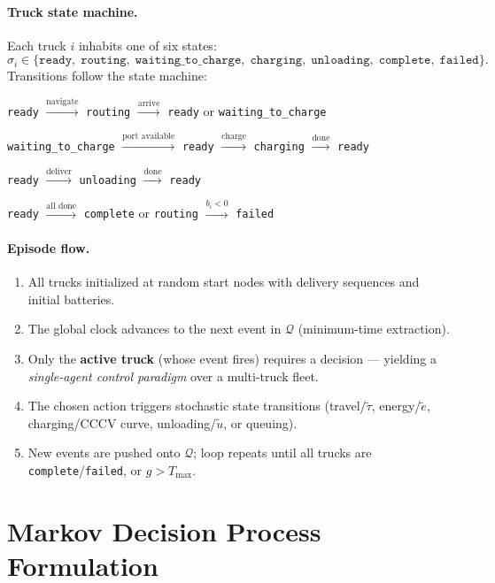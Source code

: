 \documentclass[11pt]{article}
\begin{document}
\paragraph{Truck state machine.}
Each truck $i$ inhabits one of six states:
\[
\sigma_i \in \{\texttt{ready},\; \texttt{routing},\; \texttt{waiting\_to\_charge},\; \texttt{charging},\; \texttt{unloading},\; \texttt{complete},\; \texttt{failed}\}.
\]
Transitions follow the state machine:
\begin{center}
\texttt{ready} $\xrightarrow{\text{navigate}}$ \texttt{routing} $\xrightarrow{\text{arrive}}$ \texttt{ready} or \texttt{waiting\_to\_charge}

\texttt{waiting\_to\_charge} $\xrightarrow{\text{port available}}$ \texttt{ready} $\xrightarrow{\text{charge}}$ \texttt{charging} $\xrightarrow{\text{done}}$ \texttt{ready}

\texttt{ready} $\xrightarrow{\text{deliver}}$ \texttt{unloading} $\xrightarrow{\text{done}}$ \texttt{ready}

\texttt{ready} $\xrightarrow{\text{all done}}$ \texttt{complete} \quad or \quad \texttt{routing} $\xrightarrow{b_i < 0}$ \texttt{failed}
\end{center}

\paragraph{Episode flow.}
\begin{enumerate}[nosep]
    \item All trucks initialized at random start nodes with delivery sequences and initial batteries.
    \item The global clock advances to the next event in $\mathcal{Q}$ (minimum-time extraction).
    \item Only the \textbf{active truck} (whose event fires) requires a decision --- yielding a \emph{single-agent control paradigm} over a multi-truck fleet.
    \item The chosen action triggers stochastic state transitions (travel/$\tilde{\tau}$, energy/$\tilde{e}$, charging/CCCV curve, unloading/$\tilde{u}$, or queuing).
    \item New events are pushed onto $\mathcal{Q}$; loop repeats until all trucks are \texttt{complete}/\texttt{failed}, or $g > T_{\max}$.
\end{enumerate}

\section{Markov Decision Process Formulation}\label{sec:mdp}
\end{document}
